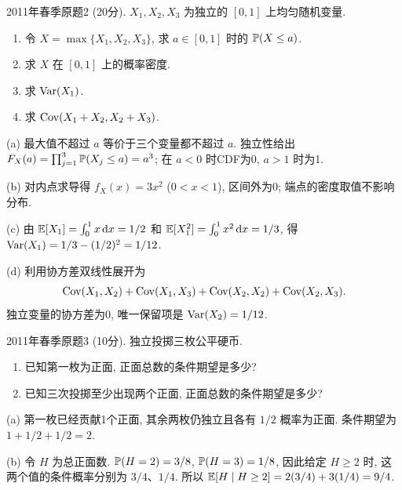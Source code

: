 \begin{exercise}\label{m2:2011s:q2}
2011年春季原题2 (20分). $X_1,X_2,X_3$ 为独立的 $[0,1]$ 上均匀随机变量.
\begin{enumerate}
\item[(a)]\label{m2:2011s:q2:a} 令 $X=\max\{X_1,X_2,X_3\}$, 求 $a\in[0,1]$ 时的 $\mathbb P(X\le a)$.
\item[(b)]\label{m2:2011s:q2:b} 求 $X$ 在 $[0,1]$ 上的概率密度.
\item[(c)]\label{m2:2011s:q2:c} 求 $\operatorname{Var}(X_1)$.
\item[(d)]\label{m2:2011s:q2:d} 求 $\operatorname{Cov}(X_1+X_2,X_2+X_3)$.
\end{enumerate}
\end{exercise}
\begin{solution}
(a) 最大值不超过 $a$ 等价于三个变量都不超过 $a$. 独立性给出 $F_X(a)=\prod_{j=1}^3\mathbb P(X_j\le a)=a^3$; 在 $a<0$ 时CDF为0, $a>1$ 时为1.

(b) 对内点求导得 $f_X(x)=3x^2$ ($0<x<1$), 区间外为0; 端点的密度取值不影响分布.

(c) 由 $\mathbb E[X_1]=\int_0^1x\,\mathrm d x=1/2$ 和 $\mathbb E[X_1^2]=\int_0^1x^2\,\mathrm d x=1/3$, 得 $\operatorname{Var}(X_1)=1/3-(1/2)^2=1/12$.

(d) 利用协方差双线性展开为
\[
\operatorname{Cov}(X_1,X_2)+\operatorname{Cov}(X_1,X_3)+\operatorname{Cov}(X_2,X_2)+\operatorname{Cov}(X_2,X_3).
\]
独立变量的协方差为0, 唯一保留项是 $\operatorname{Var}(X_2)=1/12$.
\end{solution}

\begin{exercise}\label{m2:2011s:q3}
2011年春季原题3 (10分). 独立投掷三枚公平硬币.
\begin{enumerate}
\item[(a)]\label{m2:2011s:q3:a} 已知第一枚为正面, 正面总数的条件期望是多少?
\item[(b)]\label{m2:2011s:q3:b} 已知三次投掷至少出现两个正面, 正面总数的条件期望是多少?
\end{enumerate}
\end{exercise}
\begin{solution}
(a) 第一枚已经贡献1个正面, 其余两枚仍独立且各有 $1/2$ 概率为正面. 条件期望为 $1+1/2+1/2=2$.

(b) 令 $H$ 为总正面数. $\mathbb P(H=2)=3/8$, $\mathbb P(H=3)=1/8$, 因此给定 $H\ge2$ 时, 这两个值的条件概率分别为 $3/4$、$1/4$. 所以 $\mathbb E[H\mid H\ge2]=2(3/4)+3(1/4)=9/4$.
\end{solution}

